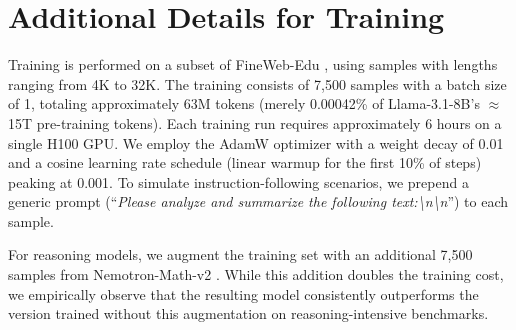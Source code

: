 \section{Additional Details for Training}
\label{app:training}

Training is performed on a subset of FineWeb-Edu \cite{fineweb}, using samples with lengths ranging from 4K to 32K. The training consists of 7,500 samples with a batch size of 1, totaling approximately 63M tokens (merely 0.00042\% of Llama-3.1-8B's $\approx$15T pre-training tokens). Each training run requires approximately 6 hours on a single H100 GPU. We employ the AdamW optimizer \cite{adamw} with a weight decay of 0.01 and a cosine learning rate schedule (linear warmup for the first 10\% of steps) peaking at 0.001. To simulate instruction-following scenarios, we prepend a generic prompt (``\textit{Please analyze and summarize the following text:\textbackslash n\textbackslash n}'') to each sample. 

For reasoning models, we augment the training set with an additional 7,500 samples from Nemotron-Math-v2 \cite{nemotronmath}. While this addition doubles the training cost, we empirically observe that the resulting model consistently outperforms the version trained without this augmentation on reasoning-intensive benchmarks.